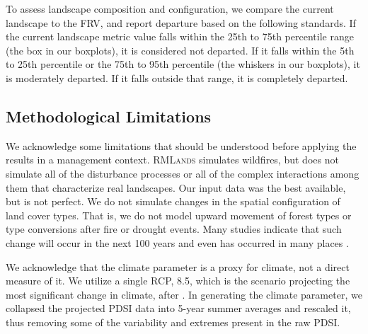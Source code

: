 To assess landscape composition and configuration, we compare the current landscape to the FRV, and report departure based on the following standards. If the current landscape metric value falls within the 25th to 75th percentile range (the box in our boxplots), it is considered not departed. If it falls within the 5th to 25th percentile or the 75th to 95th percentile (the whiskers in our boxplots), it is moderately departed. If it falls outside that range, it is completely departed.



\subsection*{Methodological Limitations}
We acknowledge some limitations that should be understood before applying the results in a management context. \textsc{RMLands} simulates wildfires, but does not simulate all of the disturbance processes or all of the complex interactions among them that characterize real landscapes. Our input data was the best available, but is not perfect. We do not simulate changes in the spatial configuration of land cover types. That is, we do not model upward movement of forest types or type conversions after fire or drought events. Many studies indicate that such change will occur in the next 100 years and even has occurred in many places \citep{Bachelet2001}. 

We acknowledge that the climate parameter is a proxy for climate, not a direct measure of it. We utilize a single RCP, 8.5, which is the scenario projecting the most significant change in climate, after \citet{Cook2014}. In generating the climate parameter, we collapsed the projected PDSI data into 5-year summer averages and rescaled it, thus removing some of the variability and extremes present in the raw PDSI.












